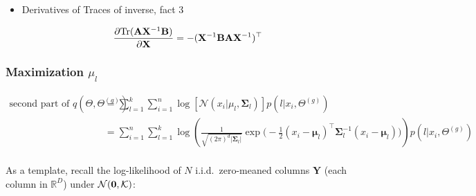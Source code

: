 \documentclass{article}
\def\X{{\mathbf X}}
\def\N{\mathcal{N}}
\def\tr{\text{tr}}
\def\Y{{\bf Y}}
\def\X{{\bf X}}
\def\K{{\bf K}}
\def\tr{\text{Tr}}
\def\SIGMA{{\boldsymbol \Sigma}}
\def\MU{\boldsymbol {\mu }}
\def\K{{\mathcal{K}}}
\def\X{{\mathbf X}}
\def\Y{{\mathbf Y}}
\begin{document}
\begin{itemize}
\item Derivatives of Traces of inverse, fact 3

\begin{equation}
\begin{split}
\frac{\partial \tr( {\bf A} \X^{-1}  {\bf B}  ) }{\partial \X} = -( {\X}^{-1}  {\bf B}  {\bf A} {\X}^{-1}    )^\top
\end{split}
\end{equation}


%
%
%

\end{itemize}






\subsubsection{Maximization $\mu_l$}




\begin{equation}
\begin{split}
\text{second part of } q(\Theta, \Theta^{(g)})
&=  \sum_{l=1}^k  \sum_{i=1}^{n} \log [\mathcal{N}(x_i | \mu_{l}, \SIGMA_{l} ) ] p(l|x_i,\Theta^{(g)})\\
&=  \sum_{i=1}^{n} \sum_{l=1}^k \log \left(  \frac{1}{\sqrt {(2\pi )^{d}|{ \SIGMA_l}|}}  {\exp \bigg(-{\frac {1}{2}}( x_i - \MU_l)^\top \SIGMA_l^{-1}(x_i - \MU_l)\bigg)} \right) p(l|x_i,\Theta^{(g)})\\
\end{split}
\end{equation}


As a template, recall the log-likelihood of $N$ i.i.d.\ zero-meaned columns $\Y$ (each column in $\mathbb{R}^D$) under $\N({\bf 0}, \K)$:
\end{document}
